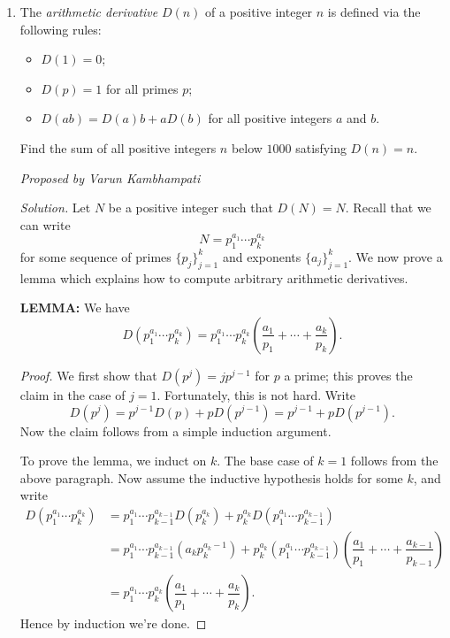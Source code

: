 \documentclass[10pt]{article}
\newcommand{\proposed}[1]
{
\vspace{5pt}
\noindent\textit{Proposed by #1}
}
\newcommand{\solution}
{
\vspace{5pt}
\noindent\textit{Solution.}\qquad
}
\begin{document}
\begin{enumerate}
	\item The \textit{arithmetic derivative} $D(n)$ of a positive integer $n$ is defined via the following rules:

\begin{itemize}

\item $D(1) = 0$;

\item $D(p)=1$ for all primes $p$;

\item $D(ab)=D(a)b+aD(b)$ for all positive integers $a$ and $b$.

\end{itemize}

Find the sum of all positive integers $n$ below $1000$ satisfying $D(n)=n$.

\proposed{Varun Kambhampati}

\solution Let $N$ be a positive integer such that $D(N) = N$.  Recall that we can write \[N = p_1^{a_1}\cdots p_k^{a_k}\] for some sequence of primes $\{p_j\}_{j=1}^k$ and exponents $\{a_j\}_{j=1}^k$.  We now prove a lemma which explains how to compute arbitrary arithmetic derivatives.

\par\textbf{LEMMA: } We have \[D\left(p_1^{a_1}\cdots p_k^{a_k}\right) = p_1^{a_1}\cdots p_k^{a_k}\left(\dfrac{a_1}{p_1}+\cdots+\dfrac{a_k}{p_k}\right).\]

\begin{proof}

We first show that $D(p^j) = jp^{j-1}$ for $p$ a prime; this proves the claim in the case of $j=1$.  Fortunately, this is not hard. Write \[D(p^j) = p^{j-1}D(p) + pD(p^{j-1}) = p^{j-1}+pD(p^{j-1}).\] Now the claim follows from a simple induction argument.

\par To prove the lemma, we induct on $k$.  The base case of $k=1$ follows from the above paragraph.  Now assume the inductive hypothesis holds for some $k$, and write \begin{align*}D\left(p_1^{a_1}\cdots p_k^{a_k}\right) &= p_1^{a_1}\cdots p_{k-1}^{a_{k-1}}D\left(p_k^{a_k}\right) + p_k^{a_k}D\left(p_1^{a_1}\cdots p_{k-1}^{a_{k-1}}\right)\\&=p_1^{a_1}\cdots p_{k-1}^{a_{k-1}}\left(a_kp_k^{a_k-1}\right) + p_k^{a_k}\left(p_1^{a_1}\cdots p_{k-1}^{a_{k-1}}\right)\left(\dfrac{a_1}{p_1}+\cdots+\dfrac{a_{k-1}}{p_{k-1}}\right)\\&=p_1^{a_1}\cdots p_k^{a_k}\left(\dfrac{a_1}{p_1}+\cdots+\dfrac{a_k}{p_k}\right).\end{align*} Hence by induction we're done.


\end{proof}
\end{enumerate}
\end{document}
